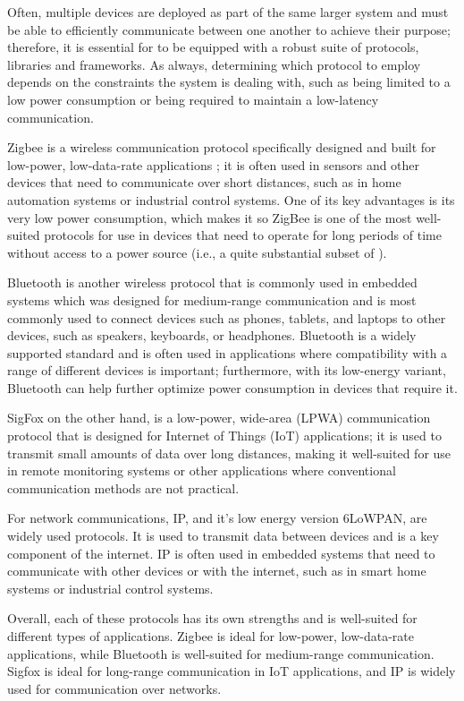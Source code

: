 Often, multiple devices are deployed as part of the same larger system and must be able to efficiently communicate between one another to achieve their purpose; therefore, it is essential for \ess to be equipped with a robust suite of protocols, libraries and frameworks.
As always, determining which protocol to employ depends on the constraints the system is dealing with, such as being limited to a low power consumption or being required to maintain a low-latency communication.

Zigbee is a wireless communication protocol specifically designed and built for low-power, low-data-rate applications \cite{Zigbee}; it is often used in sensors and other devices that need to communicate over short distances, such as in home automation systems or industrial control systems. One of its key advantages is its very low power consumption, which makes it so ZigBee is one of the most well-suited protocols for use in devices that need to operate for long periods of time without access to a power source (i.e., a quite substantial subset of \ess).

Bluetooth is another wireless protocol that is commonly used in embedded systems which was designed for medium-range communication and is most commonly used to connect devices such as phones, tablets, and laptops to other devices, such as speakers, keyboards, or headphones. Bluetooth is a widely supported standard and is often used in applications where compatibility with a range of different devices is important; furthermore, with its low-energy variant, Bluetooth can help further optimize power consumption in devices that require it.

SigFox on the other hand, is a low-power, wide-area (LPWA) communication protocol that is designed for Internet of Things (IoT) applications; it is used to transmit small amounts of data over long distances, making it well-suited for use in remote monitoring systems or other applications where conventional communication methods are not practical.

For network communications, IP, and it's low energy version 6LoWPAN, are widely used protocols. It is used to transmit data between devices and is a key component of the internet. IP is often used in embedded systems that need to communicate with other devices or with the internet, such as in smart home systems or industrial control systems.

Overall, each of these protocols has its own strengths and is well-suited for different types of applications. Zigbee is ideal for low-power, low-data-rate applications, while Bluetooth is well-suited for medium-range communication. Sigfox is ideal for long-range communication in IoT applications, and IP is widely used for communication over networks.



